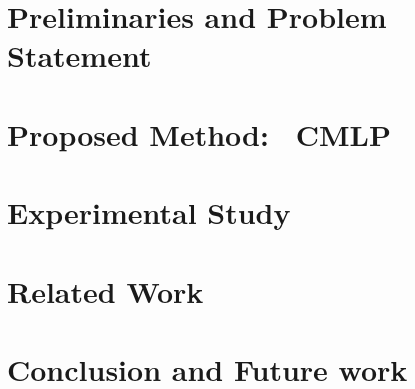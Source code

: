 \documentclass[11pt]{article}
\def\dname{CMLP}
\begin{document}
\section{Preliminaries and Problem Statement}
\label{section:model}




\section{Proposed Method: ~\dname}
\label{section:model}



\section{Experimental Study}
\label{section:experiment}


\section{Related Work}
\label{section:related}


\section{Conclusion and Future work}
\label{section:conclusion}



%
%
\end{document}
